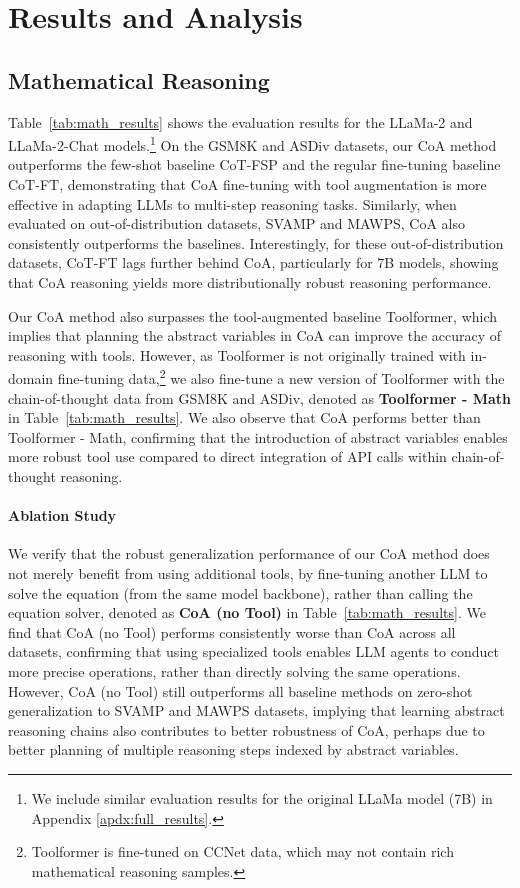 \section{Results and Analysis}
\label{results_analysis}
\subsection{Mathematical Reasoning}
\label{math_qa_exp}
Table~\ref{tab:math_results} shows the evaluation results for the LLaMa-2 and LLaMa-2-Chat models.\footnote{We include similar evaluation results for the original LLaMa model (7B) in Appendix \ref{apdx:full_results}.}
On the GSM8K and ASDiv datasets, our CoA method outperforms the few-shot baseline CoT-FSP and the regular fine-tuning baseline CoT-FT, demonstrating that CoA fine-tuning with tool augmentation is more effective in adapting LLMs to multi-step reasoning tasks.
Similarly, when evaluated on out-of-distribution datasets, SVAMP and MAWPS, CoA also consistently outperforms the baselines.
Interestingly, for these out-of-distribution datasets, CoT-FT lags further behind CoA, particularly for 7B models, showing that CoA reasoning yields more distributionally robust reasoning performance.

Our CoA method also surpasses the tool-augmented baseline Toolformer, which implies that planning the abstract variables in CoA can improve the accuracy of reasoning with tools.
However, as Toolformer is not originally trained with in-domain fine-tuning data,\footnote{Toolformer is fine-tuned on CCNet data, which may not contain rich mathematical reasoning samples.} we also fine-tune a new version of Toolformer with the chain-of-thought data from GSM8K and ASDiv, denoted as \textbf{Toolformer - Math} in Table~\ref{tab:math_results}.
We also observe that CoA performs better than Toolformer - Math, confirming that the introduction of abstract variables enables more robust tool use compared to direct integration of API calls within chain-of-thought reasoning.

\paragraph{Ablation Study}
We verify that the robust generalization performance of our CoA method does not merely benefit from using additional tools, by fine-tuning another LLM to solve the equation (from the same model backbone), rather than calling the equation solver, denoted as \textbf{CoA (no Tool)} in Table~\ref{tab:math_results}. 
We find that CoA (no Tool) performs consistently worse than CoA across all datasets, confirming that using specialized tools enables LLM agents to conduct more precise operations, rather than directly solving the same operations.
However, CoA (no Tool) still outperforms all baseline methods on zero-shot generalization to SVAMP and MAWPS datasets, implying that learning abstract reasoning chains also contributes to better robustness of CoA, perhaps due to better planning of multiple reasoning steps indexed by abstract variables.

